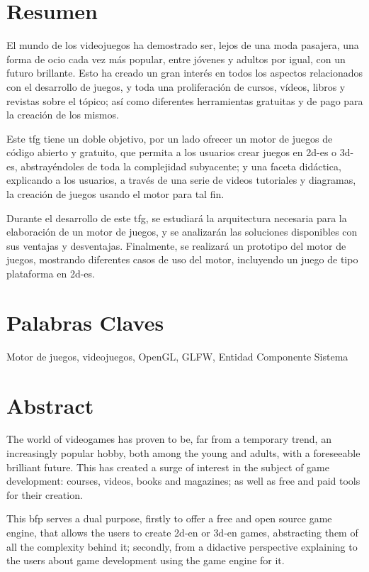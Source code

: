 \section*{Resumen}

El mundo de los videojuegos ha demostrado ser, lejos de una moda pasajera, una forma de ocio cada vez más popular, entre jóvenes
y adultos por igual, con un futuro brillante. Esto ha creado un gran interés en todos los aspectos relacionados con 
el desarrollo de juegos, y toda una proliferación de cursos, vídeos, libros y revistas sobre el tópico; así como 
diferentes herramientas gratuitas y de pago para la creación de los mismos.

Este \gls{tfg} tiene un doble objetivo, por un lado ofrecer un motor de juegos de código abierto y gratuito, que permita a los usuarios
crear juegos en \gls{2d-es} o \gls{3d-es}, abstrayéndoles de toda la complejidad subyacente; y una faceta didáctica, explicando
a los usuarios, a través de una serie de videos tutoriales y diagramas, la creación de juegos usando el motor para tal fin.

Durante el desarrollo de este \gls{tfg}, se estudiará la arquitectura necesaria para la elaboración de un motor de 
juegos, y se analizarán las soluciones disponibles con sus ventajas y desventajas. Finalmente, se realizará un prototipo 
del motor de juegos, mostrando diferentes casos de uso del motor, incluyendo un juego de tipo plataforma en \gls{2d-es}.

\section*{Palabras Claves}

Motor de juegos, videojuegos, OpenGL, GLFW, Entidad Componente Sistema

\section*{Abstract}

The world of videogames has proven to be, far from a temporary trend, an increasingly popular hobby, both among the young
and adults, with a foreseeable brilliant future. This has created a surge of interest in the subject of game 
development: courses, videos, books and magazines; as well as free and paid tools for their creation.

This \gls{bfp} serves a dual purpose, firstly to offer a free and open source game engine, that allows the users to
create \gls{2d-en} or \gls{3d-en} games, abstracting them of all the complexity behind it; secondly, from a didactive
perspective explaining to the users about game development using the game engine for it.

